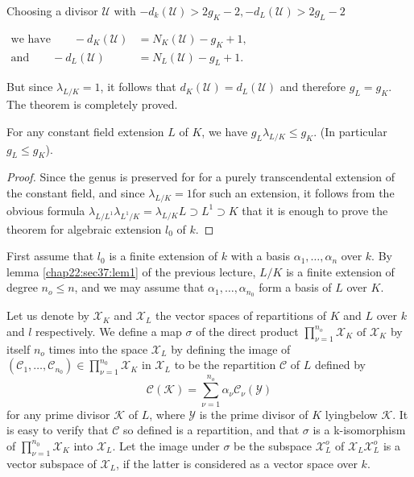 Choosing a divisor $\mathscr{U}$ with $-d_k (\mathscr{U}) > 2g_K -2,
-d_L (\mathscr{U}) > 2g_L -2$ 

\medskip
\noindent
$\begin{aligned}
  \text{we have} \qquad   - d_K (\mathscr{U})  &= N_K (\mathscr{U}) -
  g_K +1,\\
  \text{and} \qquad - d_L (\mathscr{U}) & = N_L (\mathscr{U}) - g_L +1.
\end{aligned}$\pageoriginale\
\medskip

But since $\lambda_{L/K} = 1$, it follows that $d_K (\mathscr{U}) =
d_L (\mathscr{U})$ and therefore $g_L = g_K$. The theorem is
completely proved. 

\begin{thm}\label{chap23:sec38:thm3}%
  For any constant field extension $L$ of $K$, we have $g_L
  \lambda_{L/K} \le g_K$. (In particular $g_L \le g_K$).  
\end{thm}

\begin{proof}
  Since the genus is preserved for for a purely transcendental
  extension of the constant field, and since $\lambda_{L /K} = 1$for
  such an extension, it follows from the obvious formula
  $\lambda_{L/L^1} \lambda_{L^1/K} = \lambda_{L/K} L \supset L^1
  \supset K$ that it is enough to prove the theorem for algebraic
  extension  $l_0$ of $k$. 
\end{proof}

First assume that $l_0$ is a finite extension of $k$ with a basis
$\alpha_1 ,\ldots, \alpha_n$ over $k$. By lemma \ref{chap22:sec37:lem1} of the previous
lecture, $L/K$ is a finite extension of degree $n_o \le n$, and we may
assume that $\alpha_1 ,\ldots, \alpha_{n_0}$ form a basis of $L$
over $K$.   

Let us denote by $\mathscr{X}_K$ and $\mathscr{X}_L$ the vector spaces
of repartitions of $K$ and $L$ over $k$ and $l$ respectively. We define
a map $\sigma$ of the direct product $\prod\limits^{n_o}_{\nu=1}
\mathscr{X}_K \text{ of }\mathscr{X}_K$ by itself $n_o$ times into the
space $\mathscr{X}_L$ by defining the image of  $(\mathscr{C}_1
,\ldots, \mathscr{C}_{n_0}) \in \prod\limits_{\nu =1}^{n_0}
\mathscr{X}_K \text{ in } \mathscr{X}_L$ to be the repartition
$\mathscr{C}$ of $L$ defined by 
$$
\mathscr{C} (\mathscr{K}) = \sum^{n_o}_{\nu=1} \alpha_\nu
\mathscr{C}_\nu (\mathscr{Y}) 
$$
for any prime divisor $\mathscr{K}$ of $L$, where $\mathscr{Y}$ is the
prime divisor of $K$ lying\pageoriginale below $\mathscr{K}$. It is easy to verify
that $\mathscr{C}$ so defined is a repartition, and that $\sigma$ is a
k-isomorphism of $\prod\limits^{n_0}_{\nu=1} \mathscr{X}_K$ into
$\mathscr{X}_L$. Let the image under $\sigma$ be the subspace
$\mathscr{X}^o_L$ of $\mathscr{X}_L \mathscr{X}^o_L$ is a  vector
subspace of $\mathscr{X}_L$, if the latter is considered as a vector
space over $k$. 

